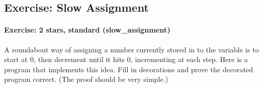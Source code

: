 \documentclass[12pt]{report}
\begin{document}
\subsection{Exercise: Slow Assignment}



\paragraph{Exercise: 2 stars, standard (slow\_assignment)}




    A roundabout way of assigning a number currently stored in  to
    the variable  is to start  at 0, then decrement  until
    it hits 0, incrementing  at each step. Here is a program that
    implements this idea.  Fill in decorations and prove the decorated
    program correct. (The proof should be very simple.) 
\end{document}
